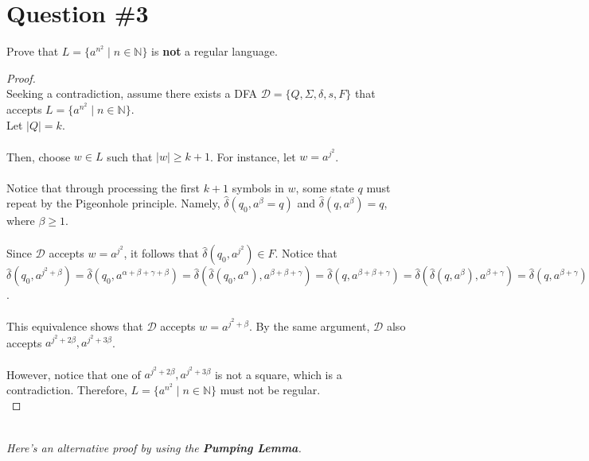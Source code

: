 \documentclass[12pt]{article}
\begin{document}
\section*{Question \#3}
Prove that \( L = \{ a^{n^2} \mid n \in \mathbb{N} \} \) is \textbf{not} a regular language.
\begin{proof}
\leavevmode\\
    Seeking a contradiction, assume there exists a DFA \( \mathcal{D} = \{ Q, \Sigma, \delta, s, F \} \) that accepts \( L = \{ a^{n^2} \mid n \in \mathbb{N} \} \). \\
    Let \( |Q| = k \). \\
    \\
    Then, choose \( w \in L \) such that \( |w| \geq k + 1 \). For instance, let \( w = a^{j^2} \). \\
    \\
    Notice that through processing the first \( k + 1 \) symbols in \( w \), some state \( q \)  must repeat by the Pigeonhole principle. Namely, \( \hat{\delta}(q_0, a^{\beta} = q)\) and \( \hat{\delta}(q, a^{\beta}) = q \), where \( \beta \geq 1 \). \\
    \\
    Since \( \mathcal{D} \) accepts \( w = a^{j^2} \), it follows that \( \hat{\delta}(q_0, a^{j^2}) \in F \). Notice that \( \hat{\delta}(q_0, a^{j^2 + \beta}) = \hat{\delta}(q_0, a^{\alpha + \beta + \gamma + \beta}) = \hat{\delta}(\hat{\delta}(q_0, a^{\alpha}), a^{\beta + \beta + \gamma}) = \hat{\delta}(q, a^{\beta + \beta + \gamma}) = \hat{\delta}(\hat{\delta}(q, a^{\beta}), a^{\beta + \gamma}) = \hat{\delta}(q, a^{\beta + \gamma}) = \hat{\delta}(\hat{\delta}(q_0, a^{alpha}), a^{\beta + \gamma}) = \hat{\delta}(q_0, a^{\alpha + \beta + \gamma}) \in F \). \\
    \\
    This equivalence shows that \( \mathcal{D} \) accepts \( w = a^{j^2 + \beta} \). By the same argument, \( \mathcal{D}  \) also accepts \( a^{j^2 + 2\beta}, a^{j^2 + 3\beta} \). \\
    \\
    However, notice that one of \( a^{j^2 + 2\beta}, a^{j^2 + 3\beta} \) is not a square, which is a contradiction. Therefore, \( L = \{ a^{n^2} \mid n \in \mathbb{N} \} \) must not be regular. \\
\end{proof}
\leavevmode\\
\textit{Here's an alternative proof by using the \textbf{Pumping Lemma}.}
\end{document}
